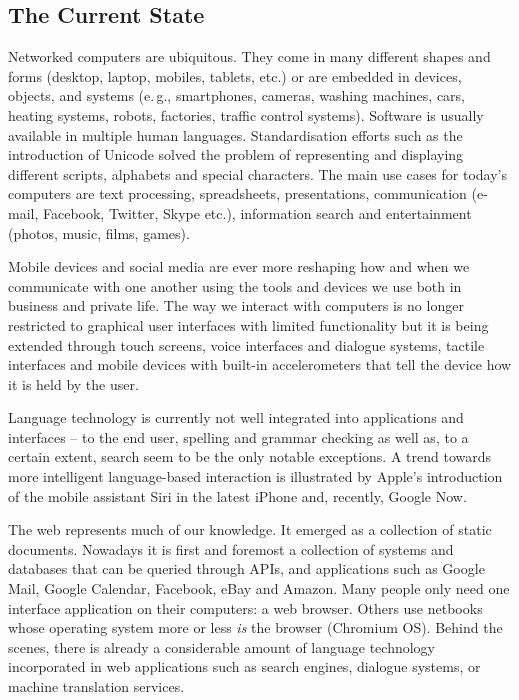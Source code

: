\documentclass[10pt, plain]{../../metanetpaper}
\begin{document}

\begin{multicols}{2}

\subsection{The Current State}
\label{sec:ict-trends}

Networked computers are ubiquitous. They come in many different shapes and forms (desktop, laptop, mobiles, tablets, etc.) or are embedded in devices, objects, and systems (e.\,g., smartphones, cameras, washing machines, cars, heating systems, robots, factories, traffic control systems). Software is usually available in multiple human languages. Standardisation efforts such as the introduction of Unicode solved the problem of representing and displaying different scripts, alphabets and special characters. The main use cases for today's computers are text processing, spreadsheets, presentations, communication (e-mail, Facebook, Twitter, Skype etc.), information search and entertainment (photos, music, films, games).

Mobile devices and social media are ever more reshaping how and when we communicate with one another using the tools and devices we use both in business and private life. The way we interact with computers is no longer restricted to graphical user interfaces with limited functionality but it is being extended through touch screens, voice interfaces and dialogue systems, tactile interfaces and mobile devices with built-in accelerometers that tell the device how it is held by the user.

Language technology is currently not well integrated into applications and interfaces -- to the end user, spelling and grammar checking as well as, to a certain extent, search seem to be the only notable exceptions. A trend towards more intelligent language-based interaction is illustrated by Apple’s introduction of the mobile assistant Siri in the latest iPhone and, recently, Google Now.

The web represents much of our knowledge. It emerged as a collection of static documents. Nowadays it is first and foremost a collection of systems and databases that can be queried through APIs, and applications such as Google Mail, Google Calendar, Facebook, eBay and Amazon. Many people only need one interface application on their computers: a web browser. Others use netbooks whose operating system more or less \emph{is} the browser (Chromium OS). Behind the scenes, there is already a considerable amount of language technology incorporated in web applications such as search engines, dialogue systems, or machine translation services.


\end{multicols}
\end{document}
